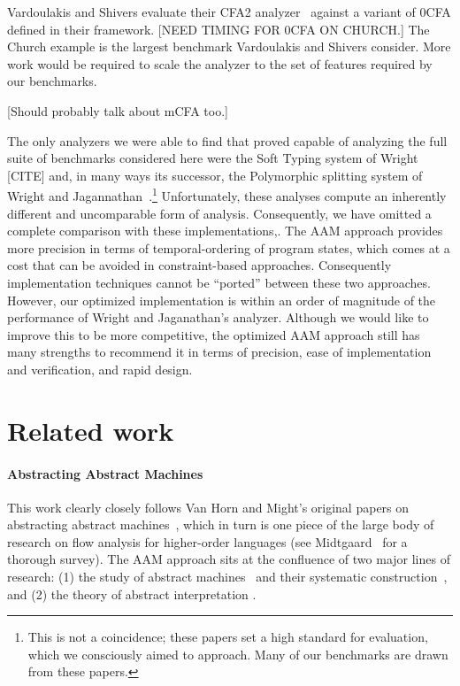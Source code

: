 \documentclass[preprint,onecolumn,9pt]{sigplanconf} %
\begin{document}
Vardoulakis and Shivers evaluate their CFA2
analyzer~\cite{dvanhorn:Vardoulakis2011CFA2} against a variant of 0CFA
defined in their framework.  [NEED TIMING FOR 0CFA ON CHURCH.]  The
Church example is the largest benchmark Vardoulakis and Shivers
consider.  More work would be required to scale the analyzer to the
set of features required by our benchmarks.

[Should probably talk about mCFA too.]

The only analyzers we were able to find that proved capable of
analyzing the full suite of benchmarks considered here were the Soft
Typing system of Wright [CITE] and, in many ways its successor, the
Polymorphic splitting system of Wright and
Jagannathan~\cite{dvanhorn:wright-jagannathan-toplas98}.\footnote{This
  is not a coincidence; these papers set a high standard for
  evaluation, which we consciously aimed to approach.  Many of our
  benchmarks are drawn from these papers.}  Unfortunately, these
analyses compute an inherently different and uncomparable form of
analysis.  Consequently, we have omitted a complete comparison with
these implementations,.  The AAM approach provides more precision in
terms of temporal-ordering of program states, which comes at a cost
that can be avoided in constraint-based approaches.  Consequently
implementation techniques cannot be ``ported'' between these two
approaches.  However, our optimized implementation is within an order
of magnitude of the performance of Wright and Jaganathan's analyzer.
Although we would like to improve this to be more competitive, the
optimized AAM approach still has many strengths to recommend it in
terms of precision, ease of implementation and verification, and rapid
design.




\section{Related work}
\label{sec:related}

\paragraph{Abstracting Abstract Machines}

This work clearly closely follows Van Horn and Might's original papers
on abstracting abstract
machines~\cite{dvanhorn:VanHorn2011Abstracting,dvanhorn:VanHorn2012Systematic},
which in turn is one piece of the large body of research on flow
analysis for higher-order languages (see
Midtgaard~\cite{dvanhorn:Midtgaard2011Controlflow} for a thorough
survey).  The AAM approach sits at the confluence of two major lines
of research: (1) the study of abstract
machines~\cite{dvanhorn:landin-64} and their systematic
construction~\cite{dvanhorn:reynolds-hosc98}, and (2) the theory of
abstract interpretation
\cite{dvanhorn:Cousot:1977:AI,dvanhorn:Cousot:1979:Galois}.
\end{document}
